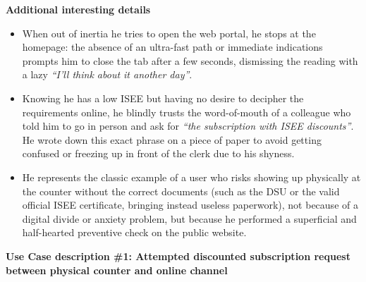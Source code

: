 ﻿\documentclass[11pt,a4paper]{article}
\begin{document}
\vspace{0.3cm}


\begin{tcolorbox}[base,colback=backgroundColor!50]
    \textbf{Additional interesting details} \\[4pt]
    {\small
    \begin{itemize}[leftmargin=*]
        \item When out of inertia he tries to open the web portal, he stops at the homepage: the absence of an ultra-fast path or immediate indications prompts him to close the tab after a few seconds, dismissing the reading with a lazy \textit{``I'll think about it another day''}.
        \item Knowing he has a low ISEE but having no desire to decipher the requirements online, he blindly trusts the word-of-mouth of a colleague who told him to go in person and ask for \textit{``the subscription with ISEE discounts''}. He wrote down this exact phrase on a piece of paper to avoid getting confused or freezing up in front of the clerk due to his shyness.
        \item He represents the classic example of a user who risks showing up physically at the counter without the correct documents (such as the DSU or the valid official ISEE certificate, bringing instead useless paperwork), not because of a digital divide or anxiety problem, but because he performed a superficial and half-hearted preventive check on the public website.
    \end{itemize}
    }
\end{tcolorbox}

\begin{tcolorbox}[sectionbox,colback=primaryColor!10]
    \textbf{Use Case description \#1: Attempted discounted subscription request between physical counter and online channel}
\end{tcolorbox}

\vspace{0.3cm}
\end{document}
